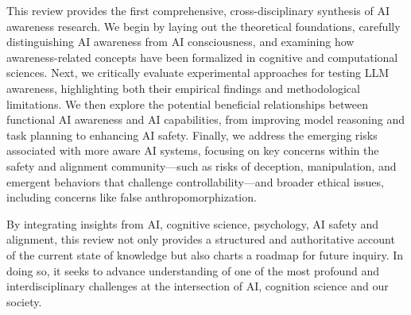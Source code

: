 This review provides the first comprehensive, cross-disciplinary synthesis of AI awareness research. We begin by laying out the theoretical foundations, carefully distinguishing AI awareness from AI consciousness, and examining how awareness-related concepts have been formalized in cognitive and computational sciences. Next, we critically evaluate experimental approaches for testing LLM awareness, highlighting both their empirical findings and methodological limitations. We then explore the potential beneficial relationships between functional AI awareness and AI capabilities, from improving model reasoning and task planning to enhancing AI safety. Finally, we address the emerging risks associated with more aware AI systems, focusing on key concerns within the safety and alignment community---such as risks of deception, manipulation, and emergent behaviors that challenge controllability---and broader ethical issues, including concerns like false anthropomorphization.



By integrating insights from AI, cognitive science, psychology, AI safety and alignment, this review not only provides a structured and authoritative account of the current state of knowledge but also charts a roadmap for future inquiry. In doing so, it seeks to advance understanding of one of the most profound and interdisciplinary challenges at the intersection of AI, cognition science and our society.

